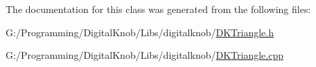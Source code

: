 The documentation for this class was generated from the following files\-:\begin{DoxyCompactItemize}
\item 
G\-:/\-Programming/\-Digital\-Knob/\-Libs/digitalknob/\hyperlink{_d_k_triangle_8h}{D\-K\-Triangle.\-h}\item 
G\-:/\-Programming/\-Digital\-Knob/\-Libs/digitalknob/\hyperlink{_d_k_triangle_8cpp}{D\-K\-Triangle.\-cpp}\end{DoxyCompactItemize}
